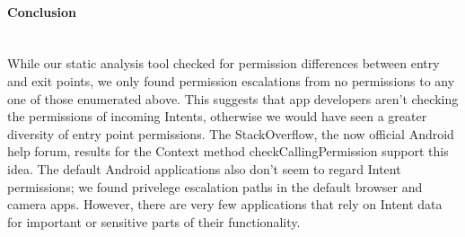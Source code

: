 \documentclass[12pt,a4paper]{article}
\begin{document}
\paragraph{Conclusion} ~\\
While our static analysis tool checked for permission differences between
entry and exit points, we only found permission escalations from no permissions
to any one of those enumerated above. This suggests that app developers aren't
checking the permissions of incoming Intents, otherwise we would have seen a
greater diversity of entry point permissions. The StackOverflow, the now
official Android help forum, results for the Context method
checkCallingPermission support this idea. The default Android applications also
don't seem to regard Intent permissions; we found privelege escalation paths in
the default browser and camera apps. However, there are very few applications
that rely on Intent data for important or sensitive parts of their
functionality.

\end{document}
